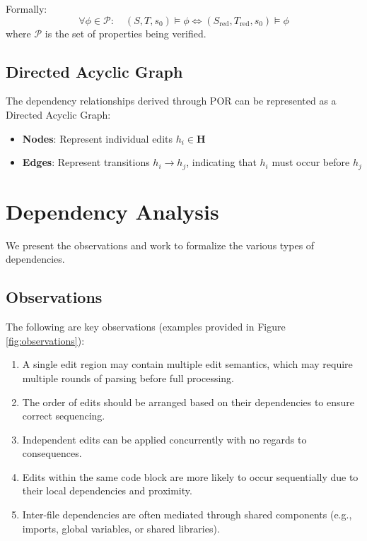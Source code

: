 Formally:
\[
\forall \phi \in \mathcal{P}: \quad (S, T, s_0) \models \phi \iff (S_{\text{red}}, T_{\text{red}}, s_0) \models \phi
\]
where \( \mathcal{P} \) is the set of properties being verified.

\subsection{Directed Acyclic Graph}
The dependency relationships derived through POR can be represented as a Directed Acyclic Graph: 
\begin{itemize}
    \item \textbf{Nodes}: Represent individual edits $h_i \in \mathbf{H}$
    \item \textbf{Edges}: Represent transitions $h_i \rightarrow h_j$, indicating that $h_i$ must occur before $h_j$
\end{itemize}

\section{Dependency Analysis}
We present the observations and work to formalize the various types of dependencies.

\subsection{Observations}

The following are key observations (examples provided in Figure \ref{fig:observations}):

\begin{enumerate}
    \item A single edit region may contain multiple edit semantics, which may require multiple rounds of parsing before full processing.
    \item The order of edits should be arranged based on their dependencies to ensure correct sequencing.
    \item Independent edits can be applied concurrently with no regards to consequences.
    \item Edits within the same code block are more likely to occur sequentially due to their local dependencies and proximity.
    \item Inter-file dependencies are often mediated through shared components (e.g., imports, global variables, or shared libraries).
\end{enumerate}


